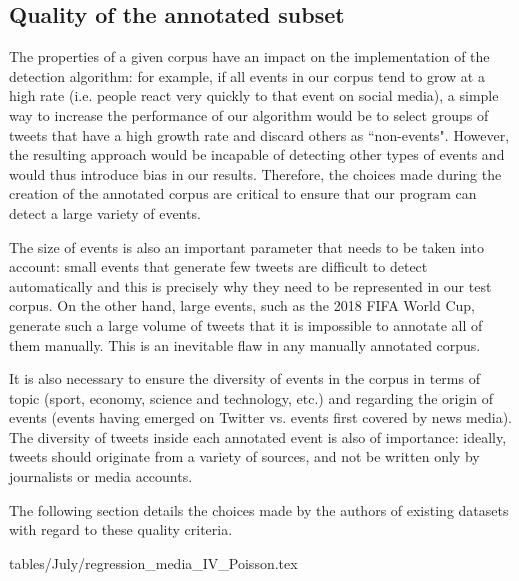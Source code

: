\subsection{Quality of the annotated subset}

The properties of a given corpus have an impact on the implementation of the detection algorithm: for example, if all events in our corpus tend to grow at a high rate (i.e. people react very quickly to that event on social media), a simple way to increase the performance of our algorithm would be to select groups of tweets that have a high growth rate and discard others as ``non-events". However, the resulting approach would be incapable of detecting other types of events and would thus introduce bias in our results. Therefore, the choices made during the creation of the annotated corpus are critical to ensure that our program can detect a large variety of events.

The size of events is also an important parameter that needs to be taken into account: small events that generate few tweets are difficult to detect automatically and this is precisely why they need to be represented in our test corpus. On the other hand, large events, such as the 2018 FIFA World Cup, generate such a large volume of tweets that it is impossible to annotate all of them manually. This is an inevitable flaw in any manually annotated corpus.

It is also necessary to ensure the diversity of events in the corpus in terms of topic (sport, economy, science and technology, etc.) and regarding the origin of events (events having emerged on Twitter vs. events first covered by news media). The diversity of tweets inside each annotated event is also of importance: ideally, tweets should originate from a variety of sources, and not be written only by journalists or media accounts.

The following section details the choices made by the authors of existing datasets with regard to these quality criteria.
        
		
tables/July/regression_media_IV_Poisson.tex

